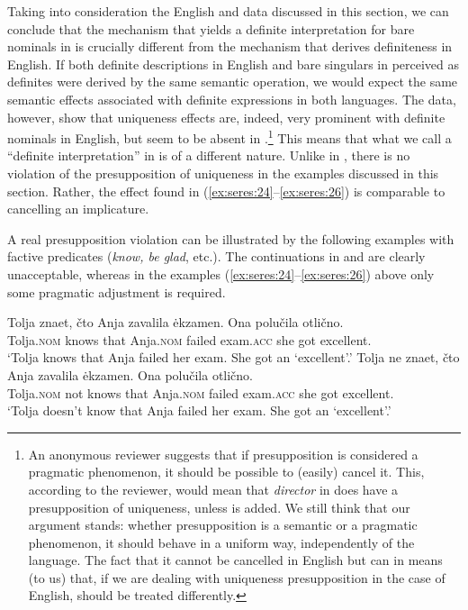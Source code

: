 \documentclass[output=paper]{langscibook}
\begin{document}
\noindent Taking into consideration the English and  data discussed in this section, we can conclude
that the mechanism that yields a definite interpretation for bare nominals in  is crucially different from the mechanism that derives definiteness in English. If both definite descriptions in English and bare singulars in  perceived as definites were derived by the same semantic operation, we would expect the same semantic effects associated with definite expressions in both languages. The data, however, show that uniqueness effects are, indeed, very prominent with definite nominals in English, but seem to be absent in .\footnote{An anonymous reviewer suggests that if presupposition is considered a pragmatic phenomenon, it should be possible to (easily) cancel it. This, according to the reviewer, would mean that \textit{director} in  does have a presupposition of uniqueness, unless  is added. We still think that our argument stands: whether presupposition is a semantic or a pragmatic phenomenon, it should behave in a uniform way, independently of the language. The fact that it cannot be cancelled in English but can in  means (to us) that, if we are dealing with uniqueness presupposition in the case of English,  should be treated differently.} This means
that what we call a ``definite interpretation'' in  is of a different nature. Unlike %
in , there is no violation of the presupposition of uniqueness in the  examples discussed in this section.
Rather, the effect found in (\ref{ex:seres:24}--\ref{ex:seres:26}) is comparable to cancelling an implicature.

A real presupposition violation can be illustrated by the following examples with factive predicates (\textit{know, be glad}, etc.). The continuations in  and  are clearly unacceptable, whereas in the examples (\ref{ex:seres:24}--\ref{ex:seres:26}) above only some pragmatic adjustment is required. %

\ea \label{ex:seres:i}
\gll Tolja		znaet,	čto		Anja		zavalila	ėkzamen.	\minsp{\#} Ona	polučila 	otlično. \\
Tolja.\textsc{nom} knows that 	Anja.\textsc{nom}	failed 		exam.\textsc{acc}  {} she 	got 		excellent.\\
\glt `Tolja knows that Anja failed her exam. She got an `excellent'.'
\z
\ea \label{ex:seres:ii}
\gll Tolja		ne		znaet, čto 		Anja 		zavalila	ėkzamen. \minsp{\#} Ona	polučila	otlično. \\
Tolja.\textsc{nom}  not	knows that 	Anja.\textsc{nom}	failed 		exam.\textsc{acc} {} she	got 		excellent.\\
\glt `Tolja doesn't know that Anja failed her exam. She got an `excellent'.'
\z
\end{document}
